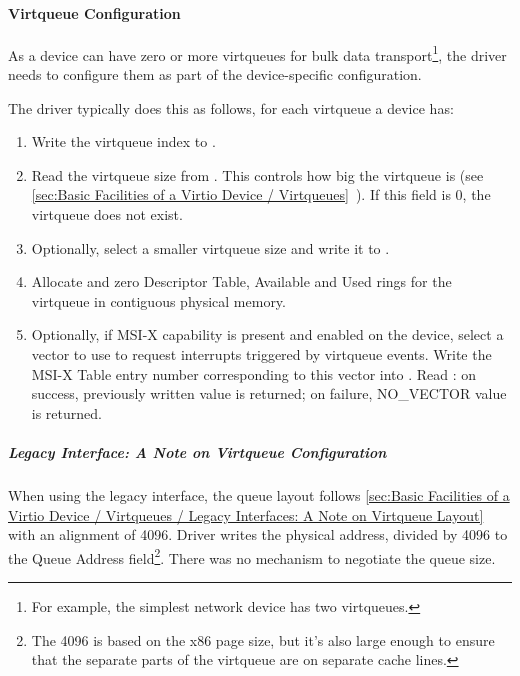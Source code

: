 \paragraph{Virtqueue Configuration}\label{sec:Virtio Transport Options / Virtio Over PCI Bus / PCI-specific Initialization And Device Operation / Device Initialization / Virtqueue Configuration}

As a device can have zero or more virtqueues for bulk data
transport\footnote{For example, the simplest network device has two virtqueues.}, the driver
needs to configure them as part of the device-specific
configuration.

The driver typically does this as follows, for each virtqueue a device has:

\begin{enumerate}
\item Write the virtqueue index to .

\item Read the virtqueue size from . This controls how big the virtqueue is
  (see \ref{sec:Basic Facilities of a Virtio Device / Virtqueues}~). If this field is 0, the virtqueue does not exist.

\item Optionally, select a smaller virtqueue size and write it to .

\item Allocate and zero Descriptor Table, Available and Used rings for the
   virtqueue in contiguous physical memory.

\item Optionally, if MSI-X capability is present and enabled on the
  device, select a vector to use to request interrupts triggered
  by virtqueue events. Write the MSI-X Table entry number
  corresponding to this vector into . Read
  : on success, previously written value is
  returned; on failure, NO_VECTOR value is returned.
\end{enumerate}

\subparagraph{Legacy Interface: A Note on Virtqueue Configuration}\label{sec:Virtio Transport Options / Virtio Over PCI Bus / PCI-specific Initialization And Device Operation / Device Initialization / Virtqueue Configuration / Legacy Interface: A Note on Virtqueue Configuration}
When using the legacy interface, the queue layout follows \ref{sec:Basic Facilities of a Virtio Device / Virtqueues / Legacy Interfaces: A Note on Virtqueue Layout}~ with an alignment of 4096.
Driver writes the physical address, divided
by 4096 to the Queue Address field\footnote{The 4096 is based on the x86 page size, but it's also large
enough to ensure that the separate parts of the virtqueue are on
separate cache lines.
}.  There was no mechanism to negotiate the queue size.

